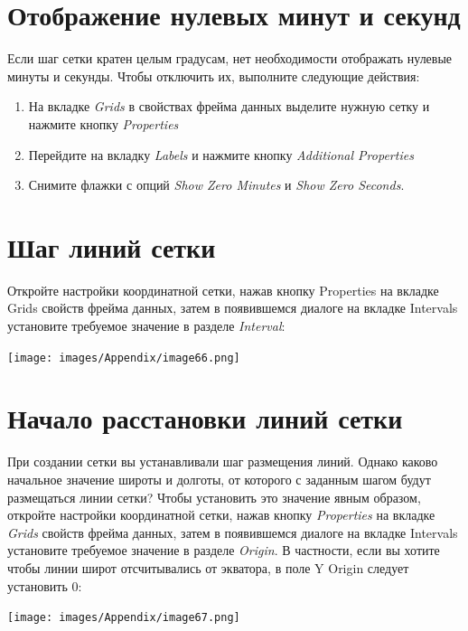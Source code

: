\documentclass[12pt,]{book}
\begin{document}
\hypertarget{manual-projections-zero-degrees}{%
\section{Отображение нулевых минут и секунд}\label{manual-projections-zero-degrees}}

Если шаг сетки кратен целым градусам, нет необходимости отображать нулевые минуты и секунды. Чтобы отключить их, выполните следующие действия:

\begin{enumerate}
\def\labelenumi{\arabic{enumi}.}
\item
  На вкладке \emph{Grids} в свойствах фрейма данных выделите нужную сетку и нажмите кнопку \emph{Properties}
\item
  Перейдите на вкладку \emph{Labels} и нажмите кнопку \emph{Additional Properties}
\item
  Снимите флажки с опций \emph{Show Zero Minutes} и \emph{Show Zero Seconds}.
\end{enumerate}

\hypertarget{section-40}{%
\section{Шаг линий сетки}\label{section-40}}

Откройте настройки координатной сетки, нажав кнопку Properties на вкладке Grids свойств фрейма данных, затем в появившемся диалоге на вкладке Intervals установите требуемое значение в разделе \emph{Interval}:

\texttt{[image: images/Appendix/image66.png]}

\hypertarget{section-41}{%
\section{Начало расстановки линий сетки}\label{section-41}}

При создании сетки вы устанавливали шаг размещения линий. Однако каково начальное значение широты и долготы, от которого с заданным шагом будут размещаться линии сетки? Чтобы установить это значение явным образом, откройте настройки координатной сетки, нажав кнопку \emph{Properties} на вкладке \emph{Grids} свойств фрейма данных, затем в появившемся диалоге на вкладке Intervals установите требуемое значение в разделе \emph{Origin}. В частности, если вы хотите чтобы линии широт отсчитывались от экватора, в поле Y Origin следует установить 0:

\texttt{[image: images/Appendix/image67.png]}
\end{document}
